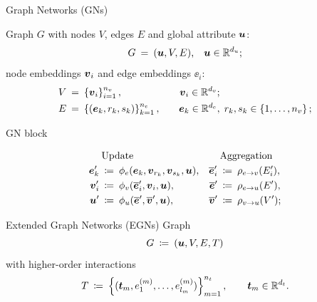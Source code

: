 \begin{frame}{Graph Networks (GNs)}

    Graph $G$ with nodes $V$, edges $E$ and global attribute $\boldsymbol{u}$:
    \[
        G \: = \: (\boldsymbol{u}, V, E) \text{,} \quad \boldsymbol{u} \in \mathbb{R}^{d_u} \text{;}
    \]
    node embeddings $\boldsymbol{v}_i$ and edge embeddings $\ee_i$:
    \begin{align*}
        V \: &= \: \left\{\boldsymbol{v}_i\right\}_{i=1}^{n_v},             &\quad \boldsymbol{v}_i \in \mathbb{R}^{d_v}&; \\
        E \: &= \: \left\{(\boldsymbol{e}_k, r_k, s_k)\right\}_{k=1}^{n_e}, &\quad \boldsymbol{e}_k \in \mathbb{R}^{d_e}&, \; r_k, s_k \in \left\{1, \dots, n_v\right\};
    \end{align*}
    
\end{frame}

\begin{frame}{GN block}
    
    \begin{align*}
        &\text{Update} & & \text{Aggregation} \\
        \vspace*{2em}
        \ee_k' \: &\coloneqq \: \phi_e(\ee_k, \vv_{r_k}, \vv_{s_k}, \uu), 
        &\overline{\ee}'_i \: &\coloneqq \: \rho_{e \to v}(E_i'), \\
        \vv_i' \: &\coloneqq \: \phi_v(\overline{\ee}'_i, \vv_i, \uu), 
        &\overline{\ee}' \: &\coloneqq \: \rho_{e \to u}(E'), \\
        \uu' \: &\coloneqq \: \phi_u(\overline{\ee}', \overline{\vv}', \uu),
        &\overline{\vv}' \: &\coloneqq \: \rho_{v \to u}(V');
    \end{align*}

    

\end{frame}

\begin{frame}{Extended Graph Networks (EGNs) }
    Graph
    \[ G \: \coloneqq \: (\boldsymbol{u}, V, E, T) \]
    with higher-order interactions
    \[
        T \: \coloneqq \: \left\{(\boldsymbol{t}_m, e_1^{(m)}, \dots, e_{l_m}^{(m)})\right\}_{m=1}^{n_t}, 
        \qquad \boldsymbol{t}_m \in \mathbb{R}^{d_t} \text{.}
    \]
\end{frame}

